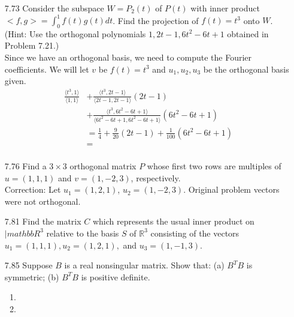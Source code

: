 \documentclass[12pt]{article}
\theoremstyle{definition}
\theoremstyle{plain}
\begin{document}
\begin{enumerate}
\item[7.73]Consider the subspace $W=P_2(t)$ of $P(t)$ with inner product $<f,g>=\int_0^1f(t)g(t)dt$. Find the projection of $f(t)=t^3$ onto $W$. (Hint: Use the orthogonal polynomials $1,2t-1,6t^2-6t+1$ obtained in Problem 7.21.)\\
	Since we have an orthogonal basis, we need to compute the Fourier coefficients. We will let $v$ be $f(t)=t^3$ and $u_1, u_2, u_3$ be the orthogonal basis given.
	\begin{align*}
	\frac{\langle t^3,1 \rangle}{\langle 1,1 \rangle} &+ \frac{\langle t^3,2t-1 \rangle}{\langle 2t-1,2t-1 \rangle}(2t-1)\\
	&+ \frac{\langle t^3,6t^2-6t+1 \rangle}{\langle 6t^2-6t+1,6t^2-6t+1 \rangle}(6t^2-6t+1)\\
	&= \frac{1}{4} + \frac{9}{20}(2t-1) + \frac{1}{100}(6t^2-6t+1)\\
	&= \\
	\end{align*}

\item[7.76]Find a $3\times 3$ orthogonal matrix $P$ whose first two rows are multiples of $u=(1,1,1)$ and $v=(1,-2,3)$, respectively.\\
Correction: Let $u_1=(1,2,1)$, $u_2=(1,-2,3)$. Original problem vectors were not orthogonal.

\item[7.81]Find the matrix $C$ which represents the usual inner product on $|mathbb{R}^3$ relative to the basis $S$ of $\mathbb{R}^3$ consisting of the vectors $u_1=(1,1,1),u_2=(1,2,1),$ and $u_3=(1,-1,3)$.

\item[7.85]Suppose $B$ is a real nonsingular matrix. Show that: (a) $B^TB$ is symmetric; (b) $B^TB$ is positive definite.
	\begin{enumerate}
	\item
	\item
	\end{enumerate}


\end{enumerate}
\end{document}
